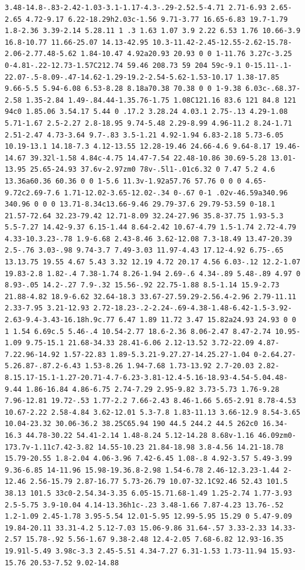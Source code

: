 \documentclass[11pt]{article}
\begin{document}
\begin{enumerate}
\begin{verbatim}
3.48-14.8-.83-2.42-1.03-3.1-1.17-4.3-.29-2.52.5-4.71 2.71-6.93 2.65-2.65 4.72-9.17 6.22-18.29h2.03c-1.56 9.71-3.77 16.65-6.83 19.7-1.79 1.8-2.36 3.39-2.14 5.28.11 1 .3 1.63 1.07 3.9 2.22 6.53 1.76 10.66-3.9 16.8-10.77 11.66-25.07 14.13-42.95 10.3-11.42-2.45-12.55-2.62-15.78-2.06-2.77.48-5.62 1.84-10.47 4.92a20.93 20.93 0 0 1-11.76 3.27c-3.25 0-4.81-.22-12.73-1.57C212.74 59.46 208.73 59 204 59c-9.1 0-15.11-.1-22.07-.5-8.09-.47-14.62-1.29-19.2-2.54-5.62-1.53-10.17 1.38-17.85 9.66-5.5 5.94-6.08 6.53-8.28 8.18a70.38 70.38 0 0 1-9.38 6.03c-.68.37-2.58 1.35-2.84 1.49-.84.44-1.35.76-1.75 1.08C121.16 83.6 121 84.8 121 94c0 1.85.06 3.54.17 5.44 0 .17.2 3.28.24 4.03.1 2.75-.13 4.29-1.08 5.71-1.67 2.5-2.27 2.8-18.95 9.74-5.48 2.29-8.99 4.96-11.2 8.24-1.71 2.51-2.47 4.73-3.64 9.7-.83 3.5-1.21 4.92-1.94 6.83-2.18 5.73-6.05 10.19-13.1 14.18-7.3 4.12-13.55 12.28-19.46 24.66-4.6 9.64-8.17 19.46-14.67 39.32l-1.58 4.84c-4.75 14.47-7.54 22.48-10.86 30.69-5.28 13.01-13.95 25.65-24.93 37.6v-2.97zm0 78v-.5l1-.01c6.32 0 7.47 5.2 4.6 13.36a60.36 60.36 0 0 1-5.6 11.3v-1.92a57.76 57.76 0 0 0 4.65-9.72c2.69-7.6 1.71-12.02-3.65-12.02-.34 0-.67 0-1 .02v-46.59a340.96 340.96 0 0 0 13.71-8.34c13.66-9.46 29.79-37.6 29.79-53.59 0-18.1 21.57-72.64 32.23-79.42 12.71-8.09 32.24-27.96 35.8-37.75 1.93-5.3 5.5-7.27 14.42-9.37 6.15-1.44 8.64-2.42 10.67-4.79 1.5-1.74 2.72-4.79 4.33-10.3.23-.78 1.9-6.68 2.43-8.46 3.62-12.08 7.3-18.49 13.47-20.39 2.5-.76 3.03-.98 9.74-3.7 7.49-3.03 11.97-4.43 17.12-4.92 6.75-.65 13.13.75 19.55 4.67 5.43 3.32 12.19 4.72 20.17 4.56 6.03-.12 12.2-1.07 19.83-2.8 1.82-.4 7.38-1.74 8.26-1.94 2.69-.6 4.34-.89 5.48-.89 4.97 0 8.93-.05 14.2-.27 7.9-.32 15.56-.92 22.75-1.88 8.5-1.14 15.9-2.73 21.88-4.82 18.9-6.62 32.64-18.3 33.67-27.59.29-2.56.4-2.96 2.79-11.11 2.33-7.95 3.21-12.93 2.72-18.23-.2-2.24-.69-4.38-1.48-6.42-1.5-3.92-2.63-9.4-3.43-16.18h.9c.77 6.47 1.89 11.72 3.47 15.82a24.93 24.93 0 0 1 1.54 6.69c.5 5.46-.4 10.54-2.77 18.6-2.36 8.06-2.47 8.47-2.74 10.95-1.09 9.75-15.1 21.68-34.33 28.41-6.06 2.12-13.52 3.72-22.09 4.87-7.22.96-14.92 1.57-22.83 1.89-5.3.21-9.27.27-14.25.27-1.04 0-2.64.27-5.26.87-.87.2-6.43 1.53-8.26 1.94-7.68 1.73-13.92 2.7-20.03 2.82-8.15.17-15.1-1.27-20.71-4.7-6.23-3.81-12.4-5.16-18.93-4.54-5.04.48-9.44 1.86-16.84 4.86-6.75 2.74-7.29 2.95-9.82 3.73-5.73 1.76-9.28 7.96-12.81 19.72-.53 1.77-2.2 7.66-2.43 8.46-1.66 5.65-2.91 8.78-4.53 10.67-2.22 2.58-4.84 3.62-12.01 5.3-7.8 1.83-11.13 3.66-12.9 8.54-3.65 10.04-23.32 30.06-36.2 38.25C65.94 190 44.5 244.2 44.5 262c0 16.34-16.3 44.78-30.22 54.41-2.14 1.48-8.24 5.12-14.28 8.68v-1.16 46.09zm0-173.7v-1.11c7.42-3.82 14.55-10.23 21.84-18.98 3.8-4.56 14.21-18.78 15.79-20.55 1.8-2.04 4.06-3.96 7.42-6.45 1.08-.8 4.92-3.57 5.49-3.99 9.36-6.85 14-11.96 15.98-19.36.8-2.98 1.54-6.78 2.46-12.3.23-1.44 2-12.46 2.56-15.79 2.87-16.77 5.73-26.79 10.07-32.1C92.46 52.43 101.5 38.13 101.5 33c0-2.54.34-3.35 6.05-15.71.68-1.49 1.25-2.74 1.77-3.93 2.5-5.75 3.9-10.04 4.14-13.36h1c-.23 3.48-1.66 7.87-4.23 13.76-.52 1.2-1.09 2.45-1.78 3.95-5.54 12.01-5.95 12.99-5.95 15.29 0 5.47-9.09 19.84-20.11 33.31-4.2 5.12-7.03 15.06-9.86 31.64-.57 3.33-2.33 14.33-2.57 15.78-.92 5.56-1.67 9.38-2.48 12.4-2.05 7.68-6.82 12.93-16.35 19.91l-5.49 3.98c-3.3 2.45-5.51 4.34-7.27 6.31-1.53 1.73-11.94 15.93-15.76 20.53-7.52 9.02-14.88 
\end{verbatim}
\end{enumerate}
\end{document}
